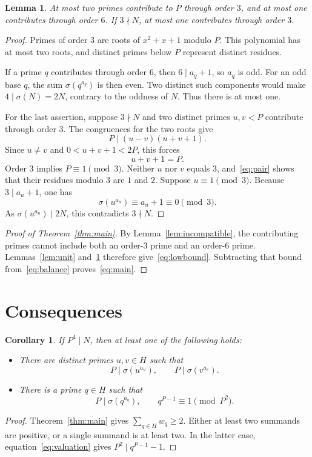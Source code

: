 \documentclass[11pt]{article}
\newtheorem{lemma}[theorem]{Lemma}
\newtheorem{corollary}[theorem]{Corollary}
\theoremstyle{remark}
\begin{document}
\begin{lemma}\label{lem:count}
At most two primes contribute to $P$ through order $3$, and at most one contributes through order $6$. If $3\nmid N$, at most one contributes through order $3$.
\end{lemma}
\begin{proof}
Primes of order $3$ are roots of $x^2+x+1$ modulo $P$. This polynomial has at most two roots, and distinct primes below $P$ represent distinct residues.

If a prime $q$ contributes through order $6$, then $6\mid a_q+1$, so $a_q$ is odd. For an odd base $q$, the sum $\sigma(q^{a_q})$ is then even. Two distinct such components would make $4\mid\sigma(N)=2N$, contrary to the oddness of $N$. Thus there is at most one.

For the last assertion, suppose $3\nmid N$ and two distinct primes $u,v<P$ contribute through order $3$. The congruences for the two roots give
\[
 P\mid(u-v)(u+v+1).
\]
Since $u\ne v$ and $0<u+v+1<2P$, this forces
\begin{equation}\label{eq:pair}
 u+v+1=P.
\end{equation}
Order $3$ implies $P\equiv1\pmod3$. Neither $u$ nor $v$ equals $3$, and~\eqref{eq:pair} shows that their residues modulo $3$ are $1$ and $2$. Suppose $u\equiv1\pmod3$. Because $3\mid a_u+1$, one has
\[
 \sigma(u^{a_u})\equiv a_u+1\equiv0\pmod3.
\]
As $\sigma(u^{a_u})\mid2N$, this contradicts $3\nmid N$.
\end{proof}

\begin{proof}[Proof of Theorem~\ref{thm:main}]
By Lemma~\ref{lem:incompatible}, the contributing primes cannot include both an order-$3$ prime and an order-$6$ prime. Lemmas~\ref{lem:unit} and~\ref{lem:count} therefore give~\eqref{eq:lowbound}. Subtracting that bound from~\eqref{eq:balance} proves~\eqref{eq:main}.
\end{proof}

\section{Consequences}

\begin{corollary}\label{cor:fourth}
If $P^4\mid N$, then at least one of the following holds:
\begin{itemize}
\item There are distinct primes $u,v\in H$ such that
\[
 P\mid\sigma(u^{a_u}),\qquad P\mid\sigma(v^{a_v}).
\]
\item There is a prime $q\in H$ such that
\[
 P\mid\sigma(q^{a_q}),\qquad q^{P-1}\equiv1\pmod{P^2}.
\]
\end{itemize}
\end{corollary}
\begin{proof}
Theorem~\ref{thm:main} gives $\sum_{q\in H}w_q\ge2$. Either at least two summands are positive, or a single summand is at least two. In the latter case, equation~\eqref{eq:valuation} gives $P^2\mid q^{P-1}-1$.
\end{proof}
\end{document}

